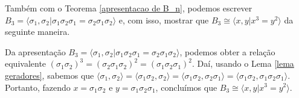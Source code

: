 \documentclass[a4paper,portuguese,11pt,twoside, leqno]{book}
\theoremstyle{definition}
\newtheorem{exercise}{Exercício}[section]
\newtheorem*{solution}{Solução}
\begin{document}
	\par\vspace{0.3cm} Também com o Teorema \eqref{apresentacao de B_n}, podemos escrever $B_3 = \langle \sigma_1,\sigma_2 | \sigma_1\sigma_2\sigma_1 = \sigma_2\sigma_1\sigma_2 \rangle$ e, com isso, mostrar que $B_3 \cong\langle x,y | x^3=y^2 \rangle$ da seguinte maneira.
	
	\par\vspace{0.3cm} Da apresentação $B_3 = \langle \sigma_1,\sigma_2 | \sigma_1\sigma_2\sigma_1 = \sigma_2\sigma_1\sigma_2 \rangle$, podemos obter a relação equivalente $(\sigma_1\sigma_2)^3 = (\sigma_2\sigma_1\sigma_2)^2 = (\sigma_1\sigma_2\sigma_1)^2$. Daí, usando o Lema \eqref{lema geradores}, sabemos que $\langle \sigma_1,\sigma_2 \rangle = \langle \sigma_1\sigma_2,\sigma_2 \rangle = \langle \sigma_1\sigma_2, \sigma_2\sigma_1 \rangle = \langle \sigma_1\sigma_2, \sigma_1\sigma_2\sigma_1 \rangle$. Portanto, fazendo $x = \sigma_1\sigma_2$ e $y = \sigma_1\sigma_2\sigma_1$, concluímos que $B_3 \cong \langle x,y | x^3=y^2 \rangle$.
	
	
	
	
	
	
	
\end{document}
